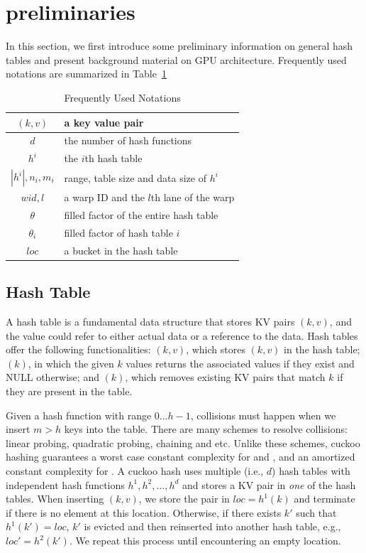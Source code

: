 \section{preliminaries}\label{sec:pre}
In this section, we first introduce some preliminary information on general hash tables and  present background material on GPU architecture. Frequently used notations are summarized in Table~\ref{tbl:stat:datasets}

\begin{table}
	\centering
	\caption{Frequently Used Notations}
	\vspace{-1.5em}
	\label{tbl:stat:datasets}
	\begin{tabular}{|c|l|}
		\hline
		$(k,v)$ & a key value pair \\ \hline
		$d$		& the number of hash functions \\ \hline
		$h^i$	& the $i$th hash table \\ \hline
		$|h^i|,n_i,m_i$	& range, table size and data size of $h^i$ \\ \hline
		$wid,l$	& a warp ID and the $l$th lane of the warp \\ \hline
		$\theta$& filled factor of the entire hash table \\ \hline
		$\theta_i$& filled factor of hash table $i$ \\ \hline
		$loc$	& a bucket in the hash table \\ \hline
	\end{tabular}
\end{table}

\subsection{Hash Table}
A hash table is a fundamental data structure that stores KV pairs $(k,v)$, and the value could refer to either actual data or a reference to the data.
Hash tables offer the following functionalities: $(k,v)$, which stores $(k,v)$ in the hash table; $(k)$, in which the given $k$ values returns the associated values if they exist and NULL otherwise; and $(k)$, which removes existing KV pairs that match $k$ if they are present in the table.

Given a hash function with range $0 \ldots h-1$, collisions must happen when we insert $m>h$ keys into the table. There are many schemes to resolve collisions: linear probing, quadratic probing, chaining and etc. Unlike these schemes, cuckoo hashing \cite{pagh2004cuckoo} guarantees a worst case constant complexity for  and ,  and an amortized constant complexity for . A cuckoo hash uses multiple (i.e., $d$) hash tables with independent hash functions $h^1,h^2,\ldots,h^d$ and stores a KV pair in \emph{one} of the hash tables. When inserting $(k,v)$, we store the pair in $loc=h^1(k)$ and terminate if there is no element at this location. Otherwise, if there exists $k'$ such that $h^1(k')=loc$, $k'$ is evicted and then reinserted into another hash table, e.g., $loc'=h^2(k')$.
We repeat this process until encountering an empty location.

